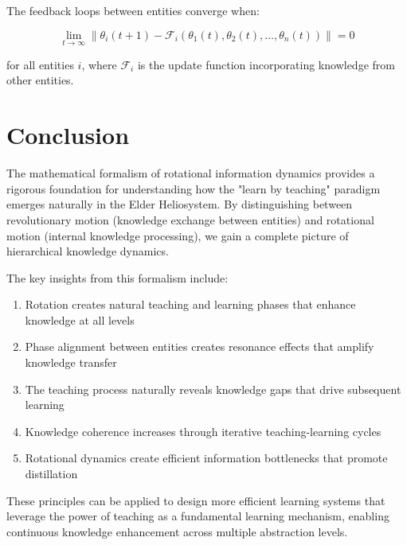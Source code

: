 \begin{definition}
The feedback loops between entities converge when:

\begin{equation}
\lim_{t \rightarrow \infty} \|\theta_i(t+1) - \mathcal{F}_i(\theta_1(t), \theta_2(t), \ldots, \theta_n(t))\| = 0
\end{equation}

for all entities $i$, where $\mathcal{F}_i$ is the update function incorporating knowledge from other entities.
\end{definition}

\section{Conclusion}

The mathematical formalism of rotational information dynamics provides a rigorous foundation for understanding how the "learn by teaching" paradigm emerges naturally in the Elder Heliosystem. By distinguishing between revolutionary motion (knowledge exchange between entities) and rotational motion (internal knowledge processing), we gain a complete picture of hierarchical knowledge dynamics.

The key insights from this formalism include:

\begin{enumerate}
    \item Rotation creates natural teaching and learning phases that enhance knowledge at all levels
    \item Phase alignment between entities creates resonance effects that amplify knowledge transfer
    \item The teaching process naturally reveals knowledge gaps that drive subsequent learning
    \item Knowledge coherence increases through iterative teaching-learning cycles
    \item Rotational dynamics create efficient information bottlenecks that promote distillation
\end{enumerate}

These principles can be applied to design more efficient learning systems that leverage the power of teaching as a fundamental learning mechanism, enabling continuous knowledge enhancement across multiple abstraction levels.